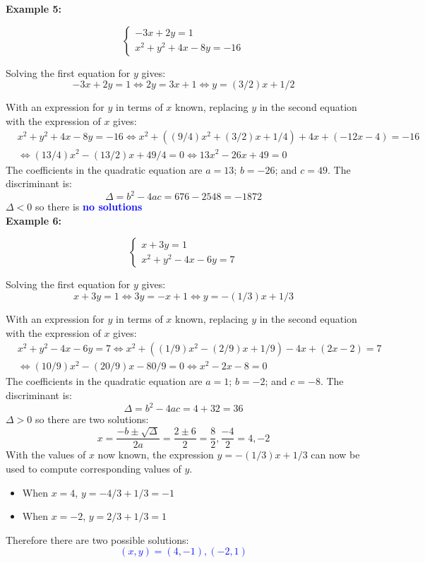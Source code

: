 \documentclass{article}
\newcommand{\dg}[1]{\textcolor{dark_green}{#1}}
\newcommand{\blue}[1]{\textcolor{blue}{#1}}
\begin{document}
\textbf{Example 5:}

\dg{\[\left\{\begin{array}{c}
-3x + 2y = 1 \\
x^2 + y^2 + 4x - 8y = -16
\end{array}\right.\]}

Solving the first equation for \(y\) gives:
\[-3x + 2y = 1 \iff 2y = 3x + 1 \iff y = (3/2)x + 1/2\]

With an expression for \(y\) in terms of \(x\) known, replacing \(y\) in the second equation with the expression of \(x\) gives:
\begin{align*}
& x^2 + y^2 + 4x - 8y = -16 
\iff x^2 + ((9/4)x^2 + (3/2)x + 1/4) + 4x + (-12x - 4) = -16 \\  
& \iff (13/4)x^2 - (13/2)x + 49/4 = 0 
\iff 13x^2 - 26x + 49 = 0
\end{align*}
The coefficients in the quadratic equation are \(a = 13\); \(b = -26\); and \(c = 49\). The discriminant is:
\[\Delta = b^2 - 4ac = 676 - 2548 = -1872\]
\(\Delta < 0\) so there is \blue{\bf no solutions} \\




\textbf{Example 6:}

\dg{\[\left\{\begin{array}{c}
x + 3y = 1 \\
x^2 + y^2 - 4x - 6y = 7
\end{array}\right.\]}

Solving the first equation for \(y\) gives:
\[x + 3y = 1 \iff 3y = -x + 1 \iff y = -(1/3)x + 1/3\]

With an expression for \(y\) in terms of \(x\) known, replacing \(y\) in the second equation with the expression of \(x\) gives:
\begin{align*}
& x^2 + y^2 - 4x - 6y = 7 
\iff x^2 + ((1/9)x^2 - (2/9)x + 1/9) - 4x + (2x - 2) = 7 \\
& \iff (10/9)x^2 - (20/9)x - 80/9 = 0
\iff x^2 - 2x - 8 = 0  
\end{align*}
The coefficients in the quadratic equation are \(a = 1\); \(b = -2\); and \(c = -8\). The discriminant is:
\[\Delta = b^2 - 4ac = 4 + 32 = 36\]
\(\Delta > 0\) so there are two solutions:
\[x = \frac{-b \pm \sqrt{\Delta}}{2a} = \frac{2 \pm 6}{2} = \frac{8}{2},\frac{-4}{2} = 4,-2\]
With the values of \(x\) now known, the expression \(y = -(1/3)x + 1/3\) can now be used to compute corresponding values of \(y\).
\begin{itemize}
\item When \(x = 4\), \(y = -4/3 + 1/3 = -1\)
\item When \(x = -2\), \(y = 2/3 + 1/3 = 1\)
\end{itemize}
Therefore there are two possible solutions:
\blue{\[(x,y) = (4,-1), (-2,1)\]}
\end{document}
